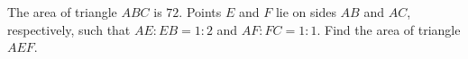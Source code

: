 The area of triangle $ABC$ is $72$. Points $E$ and $F$ lie on sides $AB$ and $AC$, respectively, such that $AE:EB=1:2$ and $AF:FC=1:1$. Find the area of triangle $AEF$.
